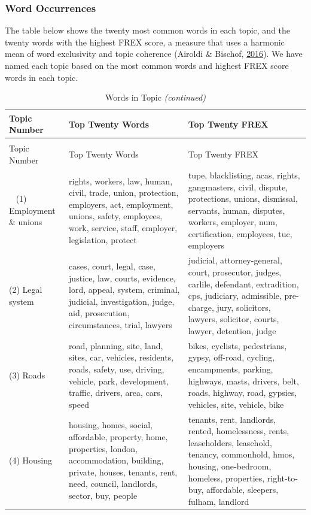 \documentclass[]{article}
\theoremstyle{definition}
\theoremstyle{definition}
\theoremstyle{definition}
\theoremstyle{remark}
\begin{document}
\hypertarget{word-occurrences}{%
\subsubsection{Word Occurrences}\label{word-occurrences}}

The table below shows the twenty most common words in each topic, and
the twenty words with the highest FREX score, a measure that uses a
harmonic mean of word exclusivity and topic coherence (Airoldi \&
Bischof, \protect\hyperlink{ref-airoldi2016}{2016}). We have named each
topic based on the most common words and highest FREX score words in
each topic.

\begin{longtabu} to 
\caption{\label{tab:topic-words-table-k0}Words in Topic}\\
\toprule
Topic Number & Top Twenty Words & Top Twenty FREX\\
\midrule
\endfirsthead
\caption[]{\label{tab:topic-words-table-k0}Words in Topic \textit{(continued)}}\\
\toprule
Topic Number & Top Twenty Words & Top Twenty FREX\\
\midrule
\endhead
\
\endfoot
\bottomrule
\endlastfoot
(1) Employment \& unions & rights, workers, law, human, civil, trade, union, protection, employers, act, employment, unions, safety, employees, work, service, staff, employer, legislation, protect & tupe, blacklisting, acas, rights, gangmasters, civil, dispute, protections, unions, dismissal, servants, human, disputes, workers, employer, num, certification, employees, tuc, employers\\
(2) Legal system & cases, court, legal, case, justice, law, courts, evidence, lord, appeal, system, criminal, judicial, investigation, judge, aid, prosecution, circumstances, trial, lawyers & judicial, attorney-general, court, prosecutor, judges, carlile, defendant, extradition, cps, judiciary, admissible, pre-charge, jury, solicitors, lawyers, solicitor, courts, lawyer, detention, judge\\
(3) Roads & road, planning, site, land, sites, car, vehicles, residents, roads, safety, use, driving, vehicle, park, development, traffic, drivers, area, cars, speed & bikes, cyclists, pedestrians, gypsy, off-road, cycling, encampments, parking, highways, masts, drivers, belt, roads, highway, road, gypsies, vehicles, site, vehicle, bike\\
(4) Housing & housing, homes, social, affordable, property, home, properties, london, accommodation, building, private, houses, tenants, rent, need, council, landlords, sector, buy, people & tenants, rent, landlords, rented, homelessness, rents, leaseholders, leasehold, tenancy, commonhold, hmos, housing, one-bedroom, homeless, properties, right-to-buy, affordable, sleepers, fulham, landlord\\

\end{longtabu}
\end{document}
